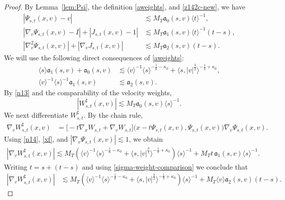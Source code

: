 \documentclass[reqno,11pt]{amsart}
\numberwithin{equation}{section}
\begin{document}
\begin{proof}
By Lemma~\ref{lem:Psi}, the definition \eqref{aweights}, and
	\eqref{z142c-new}, we have
	\begin{equation}\label{sigma-Psi}
	\begin{split}
		|\Psi_{s,t}(x,v)-v|&\lesssim M_T\mathfrak a_0(s,v)\langle t\rangle^{-1},\\
		|\nabla_v\Psi_{s,t}(x,v)-I|+|J_{s,t}(x,v)-1|&\lesssim M_T\mathfrak a_1(s,v)\langle t\rangle^{-1}(t-s),\\
		|\nabla_v^2\Psi_{s,t}(x,v)|+|\nabla_vJ_{s,t}(x,v)|&\lesssim M_T\mathfrak a_2(s,v)(t-s).
	\end{split}
	\end{equation}
	We will use the following direct consequences of \eqref{aweights}:
	\begin{equation}\label{sigma-weight-comparison}
	\begin{split}
		\langle s\rangle\mathfrak a_1(s,v)+\mathfrak a_0(s,v)
		&\lesssim
		\langle v\rangle^{-1}\langle s\rangle^{-\frac16-\kappa_0}+
		\langle s,|v|^{\frac32}\rangle^{-\frac13+\kappa_0},\\
		\langle v\rangle^{-1}\langle s\rangle^{-1}
		\mathfrak a_1(s,v)
		&\lesssim
		\mathfrak a_2(s,v).
	\end{split}
	\end{equation}
By \eqref{n13} and the comparability of the velocity weights,
	\begin{equation}\label{sigma-W}
		|W^\sharp_{s,t}(x,v)|\lesssim M_T\mathfrak a_0(s,v)\langle s\rangle^{-1}.
	\end{equation}
We next differentiate $W^\sharp_{s,t}$. By the chain rule,
	\begin{align*}
	\nabla_vW^\sharp_{s,t}(x,v)
	&=
	\Big[
	-t\nabla_xW_{s,t}
	+\nabla_vW_{s,t}
	\Big]
	\bigl(x-t\Psi_{s,t}(x,v),\Psi_{s,t}(x,v)\bigr)
	\nabla_v\Psi_{s,t}(x,v).
	\end{align*}
	Using \eqref{n14}, \eqref{xf}, and
	$|\nabla_v\Psi_{s,t}(x,v)|\lesssim1$, we obtain
	\begin{align*}
	|\nabla_vW^\sharp_{s,t}(x,v)|\lesssim
	M_T
	\left(\langle v\rangle^{-1}\langle s\rangle^{-\frac16-\kappa_0}+
	\langle s,|v|^{\frac32}\rangle^{-\frac13+\kappa_0}\right)
	\langle s\rangle^{-1}+M_Tt\,\mathfrak a_1(s,v)\langle s\rangle^{-1}.
	\end{align*}
	Writing $t=s+(t-s)$ and using
	\eqref{sigma-weight-comparison} we conclude that
	\begin{align}
	|\nabla_vW^\sharp_{s,t}(x,v)|
	&\lesssim M_T\left(
	\langle v\rangle^{-1}\langle s\rangle^{-\frac16-\kappa_0}+
	\langle s,|v|^{\frac32}\rangle^{-\frac13+\kappa_0}
	\right)
	\langle s\rangle^{-1}+
	M_T\langle v\rangle\mathfrak a_2(s,v)(t-s).
	\label{sigma-Wv}
	\end{align}


\end{proof}
\end{document}
